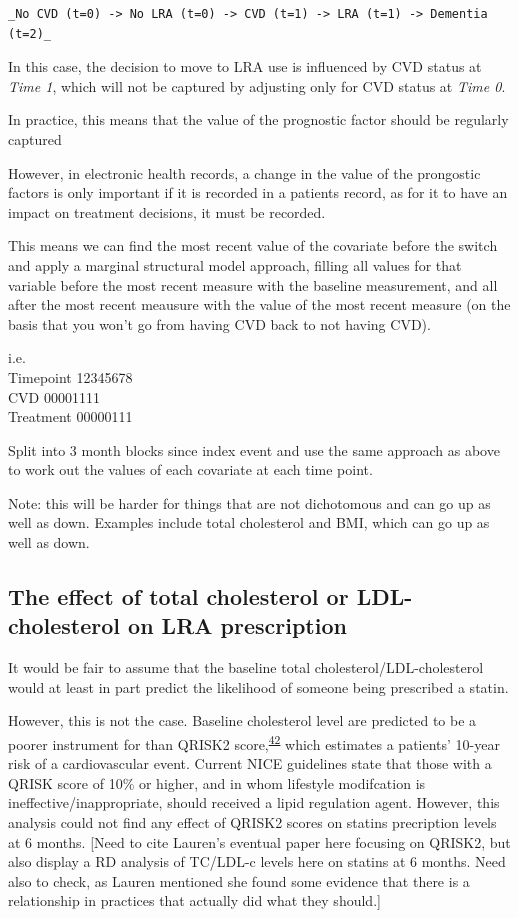 \documentclass[a4paper, twoside]{templates/ociamthesis}
\begin{document}
\begin{verbatim}
_No CVD (t=0) -> No LRA (t=0) -> CVD (t=1) -> LRA (t=1) -> Dementia (t=2)_
\end{verbatim}

In this case, the decision to move to LRA use is influenced by CVD status at \emph{Time 1}, which will not be captured by adjusting only for CVD status at \emph{Time 0}.

In practice, this means that the value of the prognostic factor should be regularly captured

However, in electronic health records, a change in the value of the prongostic factors is only important if it is recorded in a patients record, as for it to have an impact on treatment decisions, it must be recorded.

This means we can find the most recent value of the covariate before the switch and apply a marginal structural model approach, filling all values for that variable before the most recent measure with the baseline measurement, and all after the most recent meausure with the value of the most recent measure (on the basis that you won't go from having CVD back to not having CVD).

i.e.\\
Timepoint 12345678\\
CVD 00001111\\
Treatment 00000111

Split into 3 month blocks since index event and use the same approach as above to work out the values of each covariate at each time point.

Note: this will be harder for things that are not dichotomous and can go up as well as down. Examples include total cholesterol and BMI, which can go up as well as down.

\hypertarget{the-effect-of-total-cholesterol-or-ldl-cholesterol-on-lra-prescription}{%
\subsection{The effect of total cholesterol or LDL-cholesterol on LRA prescription}\label{the-effect-of-total-cholesterol-or-ldl-cholesterol-on-lra-prescription}}

It would be fair to assume that the baseline total cholesterol/LDL-cholesterol would at least in part predict the likelihood of someone being prescribed a statin.

However, this is not the case. Baseline cholesterol level are predicted to be a poorer instrument for than QRISK2 score,\textsuperscript{\protect\hyperlink{ref-hippisley-cox2008}{42}} which estimates a patients' 10-year risk of a cardiovascular event. Current NICE guidelines state that those with a QRISK score of 10\% or higher, and in whom lifestyle modifcation is ineffective/inappropriate, should received a lipid regulation agent. However, this analysis could not find any effect of QRISK2 scores on statins precription levels at 6 months. {[}Need to cite Lauren's eventual paper here focusing on QRISK2, but also display a RD analysis of TC/LDL-c levels here on statins at 6 months. Need also to check, as Lauren mentioned she found some evidence that there is a relationship in practices that actually did what they should.{]}
\end{document}
